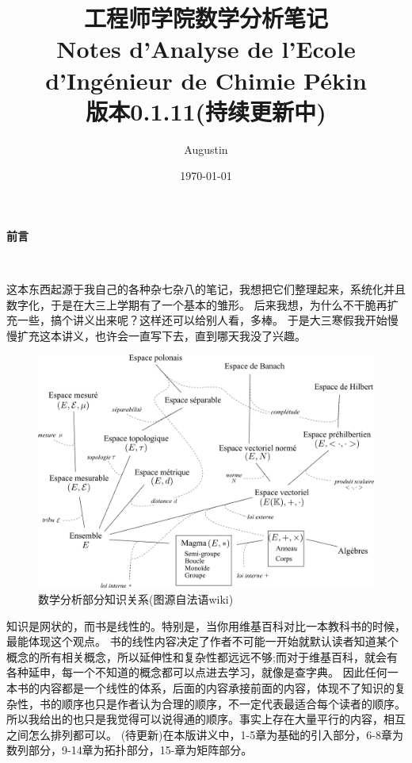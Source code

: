 \documentclass[12pt, a4paper, oneside]{ctexbook}
\title{{\Huge{\textbf{工程师学院数学分析笔记\\Notes d'Analyse de l'Ecole d'Ingénieur de Chimie Pékin}}}\\
版本0.1.11(持续更新中)}
\author{Augustin}
\date{\today}
\begin{document}
\maketitle

\setcounter{page}{1}

\begin{center}
    \Huge\textbf{前言}
\end{center}~\

这本东西起源于我自己的各种杂七杂八的笔记，我想把它们整理起来，系统化并且数字化，于是在大三上学期有了一个基本的雏形。
后来我想，为什么不干脆再扩充一些，搞个讲义出来呢？这样还可以给别人看，多棒。
于是大三寒假我开始慢慢扩充这本讲义，也许会一直写下去，直到哪天我没了兴趣。

\begin{figure}[H]%
  \centering
  \includegraphics[scale=0.5]{abstract.png}
  \caption{数学分析部分知识关系(图源自法语wiki)}
  \label{myref:abstract}
\end{figure}

知识是网状的，而书是线性的。特别是，当你用维基百科对比一本教科书的时候，最能体现这个观点。
书的线性内容决定了作者不可能一开始就默认读者知道某个概念的所有相关概念，所以延伸性和复杂性都远远不够;而对于维基百科，就会有各种延申，每一个不知道的概念都可以点进去学习，就像是查字典。
因此任何一本书的内容都是一个线性的体系，后面的内容承接前面的内容，体现不了知识的复杂性，书的顺序也只是作者认为合理的顺序，不一定代表最适合每个读者的顺序。
所以我给出的也只是我觉得可以说得通的顺序。事实上存在大量平行的内容，相互之间怎么排列都可以。
(待更新)在本版讲义中，1-5章为基础的引入部分，6-8章为数列部分，9-14章为拓扑部分，15-章为矩阵部分。
\end{document}
